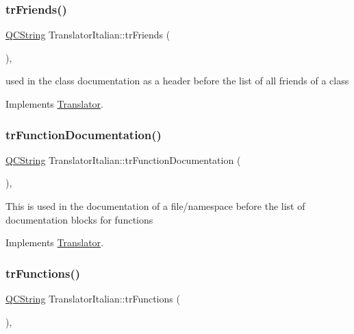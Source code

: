 \subsubsection{\texorpdfstring{trFriends()}{trFriends()}}
{\footnotesize\ttfamily \mbox{\hyperlink{class_q_c_string}{Q\+C\+String}} Translator\+Italian\+::tr\+Friends (\begin{DoxyParamCaption}{ }\end{DoxyParamCaption})\hspace{0.3cm}{\ttfamily [inline]}, {\ttfamily [virtual]}}

used in the class documentation as a header before the list of all friends of a class 

Implements \mbox{\hyperlink{class_translator}{Translator}}.

\mbox{\label{class_translator_italian_a18e5f73c0b40e13b6eee482d6c21415b}} 
\subsubsection{\texorpdfstring{trFunctionDocumentation()}{trFunctionDocumentation()}}
{\footnotesize\ttfamily \mbox{\hyperlink{class_q_c_string}{Q\+C\+String}} Translator\+Italian\+::tr\+Function\+Documentation (\begin{DoxyParamCaption}{ }\end{DoxyParamCaption})\hspace{0.3cm}{\ttfamily [inline]}, {\ttfamily [virtual]}}

This is used in the documentation of a file/namespace before the list of documentation blocks for functions 

Implements \mbox{\hyperlink{class_translator}{Translator}}.

\mbox{\label{class_translator_italian_a11d75c58403541408a7cf01827366a69}} 
\subsubsection{\texorpdfstring{trFunctions()}{trFunctions()}}
{\footnotesize\ttfamily \mbox{\hyperlink{class_q_c_string}{Q\+C\+String}} Translator\+Italian\+::tr\+Functions (\begin{DoxyParamCaption}{ }\end{DoxyParamCaption})\hspace{0.3cm}{\ttfamily [inline]}, {\ttfamily [virtual]}}

